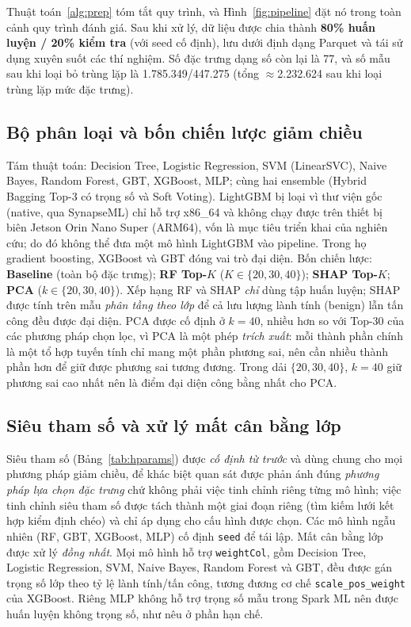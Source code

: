 \documentclass[conference]{IEEEtran}
\begin{document}
Thuật toán~\ref{alg:prep} tóm tắt quy trình, và Hình~\ref{fig:pipeline} đặt nó trong toàn cảnh quy trình đánh giá. Sau khi xử lý, dữ liệu được chia thành \textbf{80\% huấn luyện / 20\% kiểm tra} (với seed cố định), lưu dưới định dạng Parquet và tái sử dụng xuyên suốt các thí nghiệm. Số đặc trưng dạng số còn lại là 77, và số mẫu sau khi loại bỏ trùng lặp là 1.785.349/447.275 (tổng $\approx$2.232.624 sau khi loại trùng lặp mức đặc trưng).

\subsection{Bộ phân loại và bốn chiến lược giảm chiều}

Tám thuật toán: Decision Tree, Logistic Regression, SVM (LinearSVC), Naive Bayes, Random Forest, GBT, XGBoost, MLP; cùng hai ensemble (Hybrid Bagging Top-3 có trọng số và Soft Voting). LightGBM bị loại vì thư viện gốc (native, qua SynapseML) chỉ hỗ trợ x86\_64 và không chạy được trên thiết bị biên Jetson Orin Nano Super (ARM64), vốn là mục tiêu triển khai của nghiên cứu; do đó không thể đưa một mô hình LightGBM vào pipeline. Trong họ gradient boosting, XGBoost và GBT đóng vai trò đại diện. Bốn chiến lược: \textbf{Baseline} (toàn bộ đặc trưng); \textbf{RF Top-$K$} ($K \in \{20,30,40\}$); \textbf{SHAP Top-$K$}; \textbf{PCA} ($k \in \{20,30,40\}$). Xếp hạng RF và SHAP \emph{chỉ} dùng tập huấn luyện; SHAP được tính trên mẫu \emph{phân tầng theo lớp} để cả lưu lượng lành tính (benign) lẫn tấn công đều được đại diện. PCA được cố định ở $k{=}40$, nhiều hơn so với Top-30 của các phương pháp chọn lọc, vì PCA là một phép \emph{trích xuất}: mỗi thành phần chính là một tổ hợp tuyến tính chỉ mang một phần phương sai, nên cần nhiều thành phần hơn để giữ được phương sai tương đương. Trong dải $\{20,30,40\}$, $k{=}40$ giữ phương sai cao nhất nên là điểm đại diện công bằng nhất cho PCA.

\subsection{Siêu tham số và xử lý mất cân bằng lớp}
\label{sec:hparams}

Siêu tham số (Bảng~\ref{tab:hparams}) được \emph{cố định từ trước} và dùng chung cho mọi phương pháp giảm chiều, để khác biệt quan sát được phản ánh đúng \emph{phương pháp lựa chọn đặc trưng} chứ không phải việc tinh chỉnh riêng từng mô hình; việc tinh chỉnh siêu tham số được tách thành một giai đoạn riêng (tìm kiếm lưới kết hợp kiểm định chéo) và chỉ áp dụng cho cấu hình được chọn. Các mô hình ngẫu nhiên (RF, GBT, XGBoost, MLP) cố định \texttt{seed} để tái lập. Mất cân bằng lớp được xử lý \emph{đồng nhất}. Mọi mô hình hỗ trợ \texttt{weightCol}, gồm Decision Tree, Logistic Regression, SVM, Naive Bayes, Random Forest và GBT, đều được gán trọng số lớp theo tỷ lệ lành tính/tấn công, tương đương cơ chế \texttt{scale\_pos\_weight} của XGBoost. Riêng MLP không hỗ trợ trọng số mẫu trong Spark ML nên được huấn luyện không trọng số, như nêu ở phần hạn chế.
\end{document}
